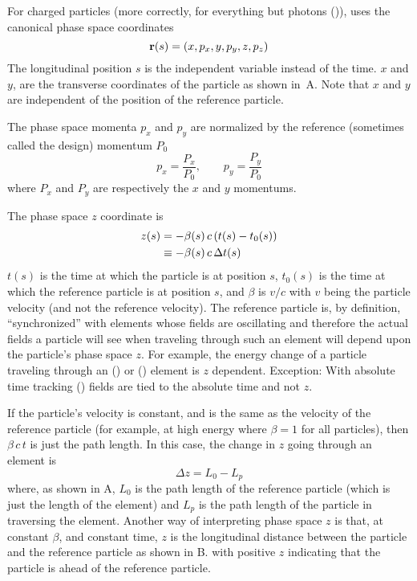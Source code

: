 For charged particles (more correctly, for everything but photons ()),
\bmad uses the canonical phase space coordinates
\begin{equation}
  {\bf r}(s) = (x, p_x, y, p_y, z, p_z)
\end{equation}
The longitudinal position $s$ is the independent variable instead of the time. $x$ and $y$, are the
transverse coordinates of the particle as shown in~A. Note that $x$ and $y$ are
independent of the position of the reference particle.

The phase space momenta $p_x$ and $p_y$ are normalized by the reference (sometimes called the
design) momentum $P_0$
\begin{equation}
  p_x = \frac{P_x}{P_0}, \qquad
  p_y = \frac{P_y}{P_0}
  \label{ppp}
\end{equation}
where $P_x$ and $P_y$ are respectively the $x$ and $y$ momentums.

The phase space $z$ coordinate is 
\begin{align}
  z(s) &= -\beta(s) \, c \, (t(s) - t_0(s)) \nonumber \\
    &\equiv - \beta(s) \, c \, \Delta t(s)
  \label{zbctt}
\end{align}
$t(s)$ is the time at which the particle is at position $s$, $t_0(s)$ is the time at which the
reference particle is at position $s$, and $\beta$ is $v/c$ with $v$ being the particle velocity
(and not the reference velocity). The reference particle is, by definition, ``synchronized'' with
elements whose fields are oscillating and therefore the actual fields a particle will see when
traveling through such an element will depend upon the particle's phase space $z$. For example, the
energy change of a particle traveling through an  () or 
() element is $z$ dependent. Exception: With absolute time tracking ()
fields are tied to the absolute time and not $z$.

If the particle's velocity is constant, and is the same as the velocity of the reference particle
(for example, at high energy where $\beta = 1$ for all particles), then $\beta \, c \, t$ is just
the path length. In this case, the change in $z$ going through an element is
\begin{equation}
  \Delta z = L_0 - L_p
\end{equation}
where, as shown in A, $L_0$ is the path length of the reference particle (which
is just the length of the element) and $L_p$ is the path length of the particle in traversing the
element.  Another way of interpreting phase space $z$ is that, at constant $\beta$, and constant
time, $z$ is the longitudinal distance between the particle and the reference particle as shown in
B. with positive $z$ indicating that the particle is ahead of the reference
particle.

